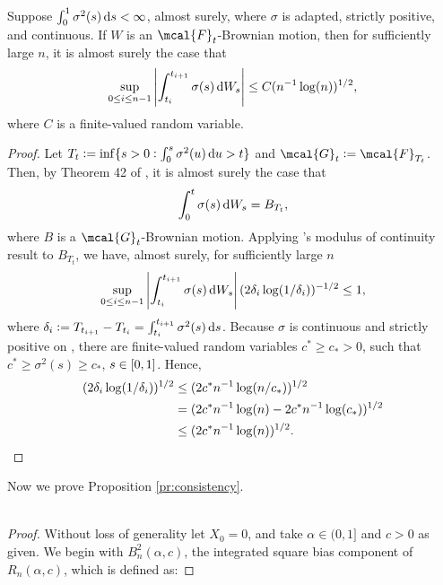 \begin{appendices}
\begin{lem} \label{lem:mylevy}
  Suppose $\int^1_0\sigma^2(s) \D s < \infty$, almost surely,   where $\sigma$ is adapted, strictly positive,  and continuous. If $W$ is an $\mcal{F}_t$-Brownian motion, then for sufficiently large $n$, it is almost surely the case that  
  \begin{align}
    \sup_{0 \le i \le n -1} \left \vert \int_{t_i}^{t_{i+1}} \sigma(s)  \D W_s   \right \vert \le C (n^{-1}  \log (n))^{1/2}, \notag
    \label{}
  \end{align}
  where $C$ is a finite-valued random variable.
\end{lem}
\begin{proof} Let $T_t := \inf\{s > 0: \int_0^s \sigma^2(u) \D u > t\}$ and  $\mcal{G}_t := \mcal{F}_{T_t}$. Then,  by Theorem 42 of \cite{Protter2004}, it is almost surely  the case that 
  \begin{align}
    \int_{0}^{t} \sigma(s)  \D W_s = B_{T_t},   \notag
    \label{}
  \end{align}
  where $B$ is a $\mcal{G}_t$-Brownian motion.
   Applying \levy's modulus of continuity result \citep[Theorem 10.32]{Rogers1994a} to $ B_{T_t} $, we have, almost surely,  for sufficiently large $n$
  \begin{align}
    \sup_{ 0 \le i \le n-1}\left\vert \int_{t_i}^{t_{i +  1}} \sigma(s)  \D W_s \right \vert  (2 \delta_i \log(1/\delta_i))^{-1/2} \le 1, 
    \label{}
  \end{align}
  where $\delta_i := T_{t_{i+1}} - T_{t_i} = \int^{t_{i + 1}}_{t_i} \sigma^2(s) \D s$. Because $\sigma$ is continuous and strictly positive on \domain, there are finite-valued random variables $c^* \ge c_* > 0$, such that $c^* \ge \sigma^2(s) \ge c_*$, $s \in [0,1]$. Hence, 
  \begin{align}
    (2 \delta_i \log(1/\delta_i))^{1/2} & \le  (2 c^*n^{-1} \log(n/c_*))^{1/2}\notag\\
    &= (2 c^*n^{-1} \log(n) - 2 c^*n^{-1} \log(c_*)  )^{1/2}\notag\\
    &\le (2 c^*n^{-1} \log(n))^{1/2}\notag.
    \label{}
  \end{align}
\end{proof}
\noindent Now we prove Proposition \eqref{pr:consistency}.\\\\
\begin{proof}
Without loss of generality let $X_0 = 0$, and  take $\alpha  \in (0, 1]$ and $c > 0$ as given. We begin with $B^2_n(\alpha, c)$, the integrated square bias component of $R_n(\alpha,c)$, which is defined as:

\end{proof}
\end{appendices}

